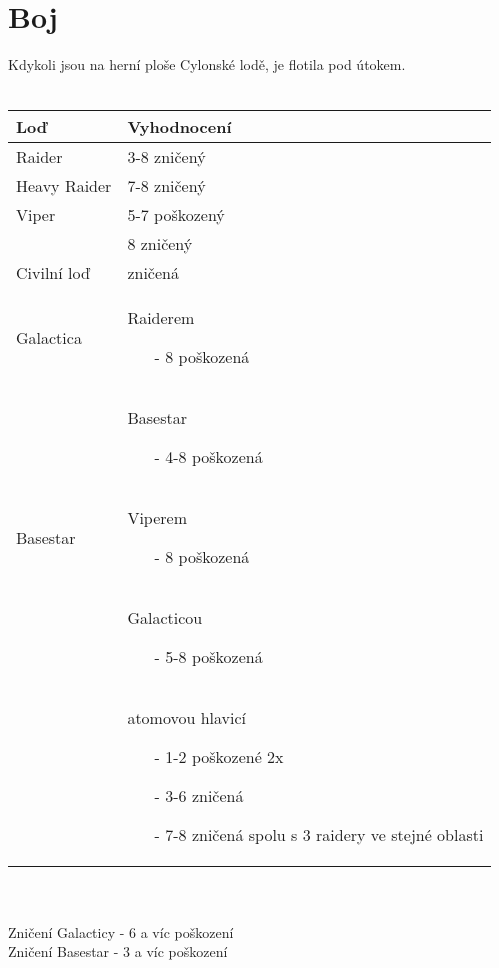 \documentclass[a4paper,twocolumn]{article}
\begin{document}
\section{Boj}
Kdykoli jsou na herní ploše Cylonské lodě, je flotila pod útokem.\\
\\
\begin{tabular}{ | l | p{5.5cm} | }
\hline
Loď & 			Vyhodnocení \\
\hline
Raider & 		3-8 zničený \\
Heavy Raider & 	7-8 zničený \\
Viper & 		5-7 poškozený \\
&				8 zničený \\
Civilní loď	&	zničená \\ 
Galactica &		Raiderem 
					\begin{itemize}
					\item[-] 8 poškozená 
					\end{itemize}
					\\
&				Basestar 
					\begin{itemize}
					\item[-] 4-8 poškozená 
					\end{itemize}
\\
Basestar & 		Viperem 
					\begin{itemize}
					\item[-] 8 poškozená 
					\end{itemize}
					\\
&			 	Galacticou 
					\begin{itemize}
					\item[-] 5-8 poškozená 
					\end{itemize}
					\\
&				atomovou hlavicí 
					\begin{itemize}
					\item[-] 1-2 poškozené 2x 
					\item[-] 3-6 zničená 
					\item[-] 7-8 zničená spolu s 3 raidery ve stejné oblasti
					\end{itemize}
					\\
\hline
\end{tabular}
\\\\
Zničení Galacticy - 6 a víc poškození\\
Zničení Basestar - 3 a víc poškození\\
\pagebreak
\end{document}
